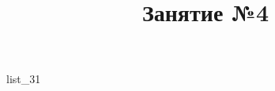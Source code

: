 \documentclass[12pt, a4paper]{article}
\begin{document}
	\title{Занятие №4}
	{list_31}
\end{document}
